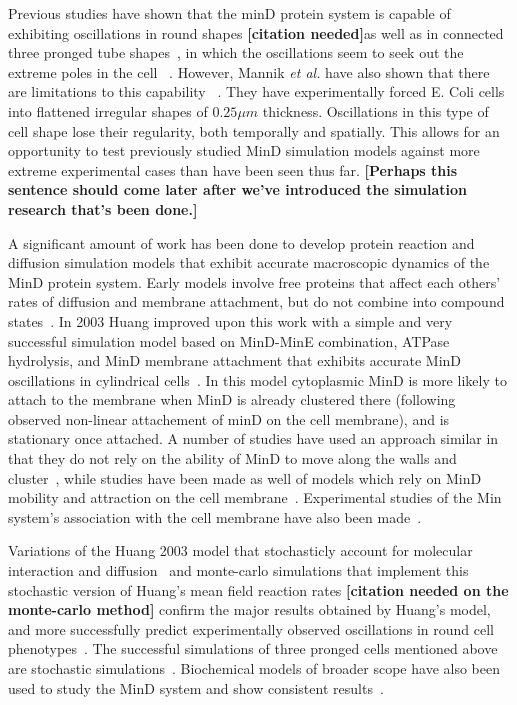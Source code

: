 \documentclass[letterpaper,twocolumn,amsmath,amssymb,pre]{revtex4-1}
\newcommand{\red}[1]{{\bf \color{red} #1}}
\newcommand{\fixme}[1]{\red{[#1]}}
\begin{document}
Previous studies have shown that the minD protein system is capable of
exhibiting oscillations in round shapes \fixme{citation needed}as well
as in connected three pronged tube shapes~\cite{varma2008min}, in
which the oscillations seem to seek out the extreme poles in the
cell~\cite{corbin2002exploring} \cite{juarez2010changes}. However,
Mannik \emph{et al.} have also shown that there are limitations to
this capability~\cite{mannik2010bacteria}
\cite{mannik2009bacterial}. They have experimentally forced E. Coli
cells into flattened irregular shapes of $0.25\mu m$
thickness. Oscillations in this type of cell shape lose their
regularity, both temporally and spatially. This allows for an
opportunity to test previously studied MinD simulation models against
more extreme experimental cases than have been seen thus
far. \fixme{Perhaps this sentence should come later after we've
  introduced the simulation research that's been done.}

A significant amount of work has been done to develop protein reaction
and diffusion simulation models that exhibit accurate macroscopic
dynamics of the MinD protein system. Early models involve free
proteins that affect each others' rates of diffusion and membrane
attachment, but do not combine into compound
states~\cite{meinhardt2001pattern}.  In 2003 Huang improved upon this
work with a simple and very successful simulation model based on
MinD-MinE combination, ATPase hydrolysis, and MinD membrane attachment
that exhibits accurate MinD oscillations in cylindrical
cells~\cite{huang2003dynamic}. In this model cytoplasmic MinD is more
likely to attach to the membrane when MinD is already clustered there
(following observed non-linear attachement of minD on the cell
membrane), and is stationary once attached.  A number of studies have
used an approach similar in that they do not rely on the ability of
MinD to move along the walls and
cluster~\cite{kruse2007experimentalist, meinhardt2001pattern,
  drew2005polymerization, fange2006noise, kerr2006division}, while
studies have been made as well of models which rely on MinD mobility
and attraction on the cell membrane~\cite{kruse2002dynamic,
  howard2005cellular}.  Experimental studies of the Min system's
association with the cell membrane have also been
made~\cite{hsieh2010direct,mileykovskaya2003effects}.

Variations of the Huang 2003 model that stochasticly account for
molecular interaction and
diffusion~\cite{kerr2006division,fange2006noise} and monte-carlo
simulations that implement this stochastic version of Huang's mean
field reaction rates \fixme{citation needed on the monte-carlo method}
confirm the major results obtained by Huang's model, and more
successfully predict experimentally observed oscillations in round
cell phenotypes~\cite{fange2006noise, huang2004min}. The successful
simulations of three pronged cells mentioned above are stochastic
simulations~\cite{varma2008min}. Biochemical models of broader scope
have also been used to study the MinD system and show consistent
results~\cite{arjunan2010new}.
\end{document}
